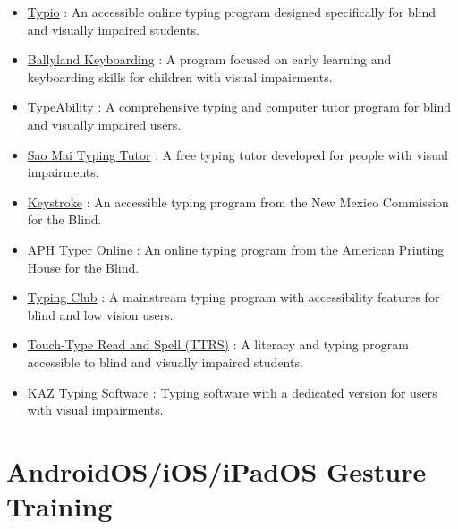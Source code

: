 \begin{itemize}
 \item \href{https://www.accessibyte.com/typio-online-page/}{Typio} \cite{Typio2025}: An accessible online typing program designed specifically for blind and visually impaired students.
 \item \href{https://www.sonokids.org/ballyland-early-learning/ballyland-keyboarding/}{Ballyland Keyboarding} \cite{Ballyland2025}: A program focused on early learning and keyboarding skills for children with visual impairments.
 \item \href{https://nelowvision.com/product/typeability-typing-and-computer-tutor-program-for-the-blind-and-visually-impaired/}{TypeAbility} \cite{TypeAbility2025}: A comprehensive typing and computer tutor program for blind and visually impaired users.
 \item \href{https://saomaicenter.org/en/smsoft/smtt}{Sao Mai Typing Tutor} \cite{SaoMai2025}: A free typing tutor developed for people with visual impairments.
 \item \href{https://www.cfb.state.nm.us/apps/}{Keystroke} \cite{Keystroke2025}: An accessible typing program from the New Mexico Commission for the Blind.
 \item \href{https://typer.aphtech.org/}{APH Typer Online} \cite{APH2025}: An online typing program from the American Printing House for the Blind.
 \item \href{https://www.typingclub.com/}{Typing Club} \cite{TypingClub2025}: A mainstream typing program with accessibility features for blind and low vision users.
 \item \href{https://www.readandspell.com/us/typing-for-the-blind}{Touch-Type Read and Spell (TTRS)} \cite{TTRS2025}: A literacy and typing program accessible to blind and visually impaired students.
 \item \href{https://kaz-type.com/visualimpairment}{KAZ Typing Software} \cite{KAZ2025}: Typing software with a dedicated version for users with visual impairments.
\end{itemize}



\section{AndroidOS/iOS/iPadOS Gesture Training}\label{appx6}

